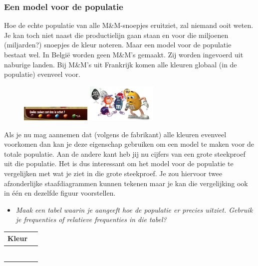 \documentclass[11pt]{article}
\newcommand{\vraag}[2]{\begin{itemize}\item {\it #1} \vspace*{#2}\end{itemize}}
\begin{document}
\subsubsection{Een model voor de populatie}

Hoe de echte populatie van alle M\&M-snoepjes eruitziet, zal niemand ooit weten. Je kan toch niet
naast die productielijn gaan staan en voor die miljoenen (miljarden?) snoepjes de kleur noteren.
Maar een model voor de populatie bestaat wel. In België worden geen M\&M’s gemaakt. Zij worden
ingevoerd uit naburige landen. Bij M\&M’s uit Frankrijk komen alle kleuren globaal (in de populatie)
evenveel voor.

\begin{figure}
  \vspace{-0.5cm}
  \includegraphics[width=0.3\textwidth]{MenM-uniforme_verdeling}
  \includegraphics[width=0.3\textwidth]{MenM-hoeveel}
\end{figure}
Als je nu mag aannemen dat (volgens de fabrikant) alle
kleuren evenveel voorkomen dan kan je deze eigenschap
gebruiken om een model te maken voor de totale
populatie. Aan de andere kant heb jij nu cijfers van een
grote steekproef uit die populatie. Het is dus interessant
om het model voor de populatie te vergelijken met wat je
ziet in die grote steekproef. Je zou hiervoor twee
afzonderlijke staafdiagrammen kunnen tekenen maar je
kan die vergelijking ook in één en dezelfde figuur
voorstellen.

\vraag{Maak een tabel waarin je aangeeft hoe de populatie er precies uitziet. Gebruik je frequenties
of relatieve frequenties in die tabel?}{0cm}

\begin{center}
  \begin{tabular}{|p{2cm}|p{2cm}|}
    \hline
    Kleur&\\
    \hline
    &\vspace*{0pt}\\
    \hline
    &\vspace*{0pt}\\
    \hline
    &\vspace*{0pt}\\
    \hline
    &\vspace*{0pt}\\
    \hline
    &\vspace*{0pt}\\
    \hline
    &\vspace*{0pt}\\
    \hline
  \end{tabular}
\end{center}
\end{document}
